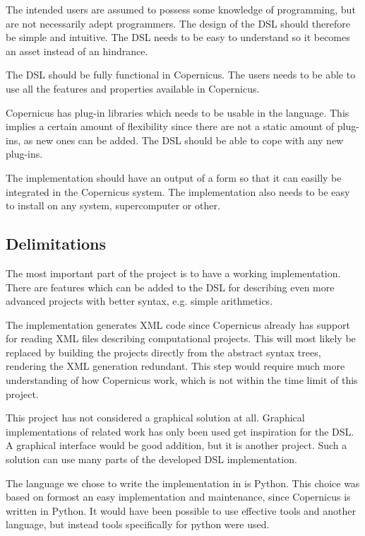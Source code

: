 The intended users are assumed to possess some knowledge of
programming, but are not necessarily adept programmers. The design of
the DSL should therefore be simple and intuitive. The DSL needs to be
easy to understand so it becomes an asset instead of an hindrance.

The DSL should be fully functional in Copernicus. The users needs to
be able to use all the features and properties available in
Copernicus.

Copernicus has plug-in libraries which needs to be usable in the
language. This implies a certain amount of flexibility since there are
not a static amount of plug-ins, as new ones can be added. The DSL
should be able to cope with any new plug-ins.

The implementation should have an output of a form so that it can
easilly be integrated in the Copernicus system. The implementation
also needs to be easy to install on any system, supercomputer or
other.

\subsection{Delimitations}
The most important part of the project is to have a working
implementation. There are features which can be added to the DSL for
describing even more advanced projects with better syntax, e.g. simple
arithmetics.

The implementation generates XML code since Copernicus already has
support for reading XML files describing computational projects. This
will most likely be replaced by building the projects directly from
the abstract syntax trees, rendering the XML generation
redundant. This step would require much more understanding of how
Copernicus work, which is not within the time limit of this project.

This project has not considered a graphical solution at all. Graphical
implementations of related work has only been used get inspiration for
the DSL. A graphical interface would be good addition, but it is
another project. Such a solution can use many parts of the developed
DSL implementation.

The language we chose to write the implementation in is Python. This
choice was based on formost an easy implementation and maintenance,
since Copernicus is written in Python. It would have been possible to
use effective tools and another language, but instead tools
specifically for python were used.




